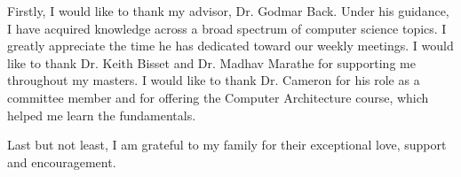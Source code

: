 Firstly, I would like to thank my advisor, Dr. Godmar Back. Under his
guidance, I have acquired knowledge across a broad spectrum of computer
science topics. I greatly appreciate the time he has dedicated toward our
weekly meetings. I would like to thank Dr. Keith Bisset and Dr. Madhav
Marathe for supporting me throughout my masters. I would like to thank
Dr. Cameron for his role as a committee member and for offering the Computer
Architecture course, which helped me learn the fundamentals.  

Last but not least, I am grateful to my family for their exceptional love,
support and encouragement.
